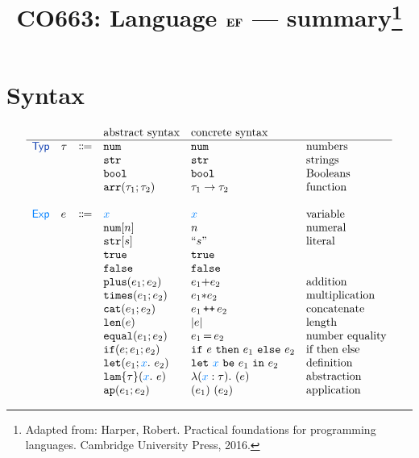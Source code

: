 \documentclass[11pt]{article}
\begin{document}
\title{CO663: Language $\textbf{EF}$ --- summary\footnote{Adapted from:
    Harper, Robert. Practical foundations for programming
    languages. Cambridge University Press, 2016.}}

\date{\vspace{-7ex}} 
\maketitle


\newcommand{\lazyeval}[1]{\framebox{\parbox[c][#1]{\textwidth}{
      \color{white}{h}%
    }}}


\section{Syntax}

\[
\begin{array}{llclll} 
  & & & \text{abstract syntax} & \text{concrete syntax}
  \\\hline
  \TYPES & \tau & \Coloneqq & \enum{}  & \enum{} & \text{numbers}
  \\
  &&& \estr{} & \estr{} & \text{strings}
  \\
  &&& \ebool{} & \ebool{} & \text{Booleans}
  \\
  &&& \tyarr{\tau_1}{\tau_2}  & \tau_1 \rightarrow \tau_2 & \text{function}
  \\ \\
  \EXPS & e & \Coloneqq  & \var{x} & \var{x} & \text{variable}
  \\
  &&& \enum{n} & n & \text{numeral}
  \\
  &&& \estr{s} & \litstr{s} & \text{literal}
  \\
  &&&  \ktrue & \ktrue 
  \\ 
  &&&  \kfalse & \kfalse 
  \\
  &&& \eplus{e_1}{e_2} & e_1 {+} e_2 & \text{addition}
  \\
  &&& \etimes{e_1}{e_2} & e_1 {*} e_2 & \text{multiplication}
  \\
  &&& \ecat{e_1}{e_2} & e_1 \concat e_2 & \text{concatenate}
  \\
  &&& \elen{e} & \lvert e \rvert & \text{length}
  \\
  &&& \eequal{e_1}{e_2} & e_1 \meq e_2 & \text{number equality}
  \\
  &&& \site{e}{e_1}{e_2} & \csite{e}{e_1}{e_2} & \text{if then else}
  \\
  &&& \elet{e_1}{x}{e_2} & \clet{e_1}{x}{e_2} & \text{definition}
  \\
  &&& \elam{\tau}{x}{e} & \clam{\tau}{x}{e} & \text{abstraction}
  \\
  &&& \eapp{e_1}{e_2} & \capp{e_1}{e_2} & \text{application}
\end{array}
\]
\end{document}

